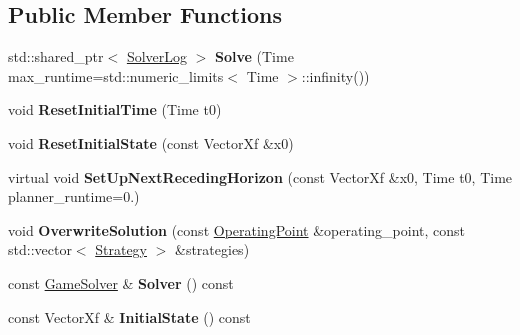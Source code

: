 \subsection*{Public Member Functions}
\begin{DoxyCompactItemize}
\item 
std\+::shared\+\_\+ptr$<$ \hyperlink{classilqgames_1_1_solver_log}{Solver\+Log} $>$ {\bfseries Solve} (Time max\+\_\+runtime=std\+::numeric\+\_\+limits$<$ Time $>$\+::infinity())\hypertarget{classilqgames_1_1_problem_ab12b009e19551f6578af998789497927}{}\label{classilqgames_1_1_problem_ab12b009e19551f6578af998789497927}

\item 
void {\bfseries Reset\+Initial\+Time} (Time t0)\hypertarget{classilqgames_1_1_problem_a559eb8753ba5b82afeb6c69dd722a306}{}\label{classilqgames_1_1_problem_a559eb8753ba5b82afeb6c69dd722a306}

\item 
void {\bfseries Reset\+Initial\+State} (const Vector\+Xf \&x0)\hypertarget{classilqgames_1_1_problem_ac59f8a49b028baa3d72cb065d35b8193}{}\label{classilqgames_1_1_problem_ac59f8a49b028baa3d72cb065d35b8193}

\item 
virtual void {\bfseries Set\+Up\+Next\+Receding\+Horizon} (const Vector\+Xf \&x0, Time t0, Time planner\+\_\+runtime=0.)\hypertarget{classilqgames_1_1_problem_adada206413bc775f078653da9c2ed033}{}\label{classilqgames_1_1_problem_adada206413bc775f078653da9c2ed033}

\item 
void {\bfseries Overwrite\+Solution} (const \hyperlink{structilqgames_1_1_operating_point}{Operating\+Point} \&operating\+\_\+point, const std\+::vector$<$ \hyperlink{structilqgames_1_1_strategy}{Strategy} $>$ \&strategies)\hypertarget{classilqgames_1_1_problem_a14744049661872191758323a4947f072}{}\label{classilqgames_1_1_problem_a14744049661872191758323a4947f072}

\item 
const \hyperlink{classilqgames_1_1_game_solver}{Game\+Solver} \& {\bfseries Solver} () const \hypertarget{classilqgames_1_1_problem_a5587e930ff86056f3ec7d2d01b43e4e5}{}\label{classilqgames_1_1_problem_a5587e930ff86056f3ec7d2d01b43e4e5}

\item 
const Vector\+Xf \& {\bfseries Initial\+State} () const \hypertarget{classilqgames_1_1_problem_a9b4d86b6f76908fdfc5ac82aae9320cb}{}\label{classilqgames_1_1_problem_a9b4d86b6f76908fdfc5ac82aae9320cb}


\end{DoxyCompactItemize}
